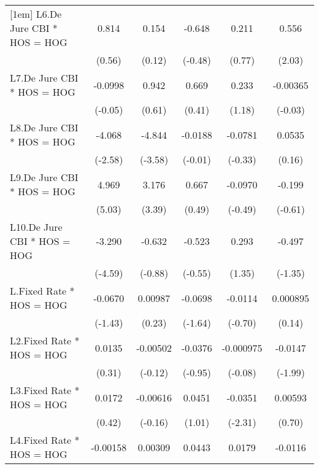 {\begin{longtable}{l*{5}{c}}
[1em]
L6.De Jure CBI * HOS = HOG&    0.814         &    0.154         &   -0.648         &    0.211         &    0.556\sym{*}  \\
                &   (0.56)         &   (0.12)         &  (-0.48)         &   (0.77)         &   (2.03)         \\
[1em]
L7.De Jure CBI * HOS = HOG&  -0.0998         &    0.942         &    0.669         &    0.233         & -0.00365         \\
                &  (-0.05)         &   (0.61)         &   (0.41)         &   (1.18)         &  (-0.03)         \\
[1em]
L8.De Jure CBI * HOS = HOG&   -4.068\sym{*}  &   -4.844\sym{***}&  -0.0188         &  -0.0781         &   0.0535         \\
                &  (-2.58)         &  (-3.58)         &  (-0.01)         &  (-0.33)         &   (0.16)         \\
[1em]
L9.De Jure CBI * HOS = HOG&    4.969\sym{***}&    3.176\sym{***}&    0.667         &  -0.0970         &   -0.199         \\
                &   (5.03)         &   (3.39)         &   (0.49)         &  (-0.49)         &  (-0.61)         \\
[1em]
L10.De Jure CBI * HOS = HOG&   -3.290\sym{***}&   -0.632         &   -0.523         &    0.293         &   -0.497         \\
                &  (-4.59)         &  (-0.88)         &  (-0.55)         &   (1.35)         &  (-1.35)         \\
[1em]
L.Fixed Rate * HOS = HOG&  -0.0670         &  0.00987         &  -0.0698         &  -0.0114         & 0.000895         \\
                &  (-1.43)         &   (0.23)         &  (-1.64)         &  (-0.70)         &   (0.14)         \\
[1em]
L2.Fixed Rate * HOS = HOG&   0.0135         & -0.00502         &  -0.0376         &-0.000975         &  -0.0147\sym{*}  \\
                &   (0.31)         &  (-0.12)         &  (-0.95)         &  (-0.08)         &  (-1.99)         \\
[1em]
L3.Fixed Rate * HOS = HOG&   0.0172         & -0.00616         &   0.0451         &  -0.0351\sym{*}  &  0.00593         \\
                &   (0.42)         &  (-0.16)         &   (1.01)         &  (-2.31)         &   (0.70)         \\
[1em]
L4.Fixed Rate * HOS = HOG& -0.00158         &  0.00309         &   0.0443         &   0.0179         &  -0.0116\sym{*}  \\

\end{longtable}}
